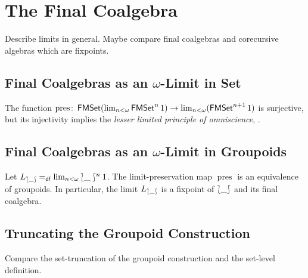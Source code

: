 \documentclass[runningheads]{llncs}
\begin{document}
\section{The Final Coalgebra}

Describe limits in general.
Maybe compare final coalgebras and corecursive algebras which are fixpoints.

\subsection{Final Coalgebras as an $\omega$-Limit in Set}


  \begin{theorem}\label{thm:InjPresImpliesLLPO}
    The function 
        $\operatorname{pres}\colon
            \operatorname{\mathsf{FMSet}} (\lim_{n < \omega} \operatorname{\mathsf{FMSet}}^n 1)
            \to
            \lim_{n < \omega} (\operatorname{\mathsf{FMSet}}^{n+1} 1)$
    is surjective,
    but its injectivity implies the \emph{lesser limited principle of omniscience}, \LLPO.
  \end{theorem}


\subsection{Final Coalgebras as an $\omega$-Limit in Groupoids}\label{ssec:FMGpdLim}

\begin{theorem}\label{thm:FMGpdLim}
  Let $L_{\lbag \mathord{\_} \rbag} \mathbin{=_\mathsf{df}} \lim_{n < \omega} \lbag \mathord{\_} \rbag^n 1$.
  The limit-preservation map $\operatorname{pres}$ is an equivalence of groupoids.
  In particular, the limit $L_{\lbag \mathord{\_} \rbag}$ is a fixpoint of $\lbag \mathord{\_} \rbag$ and its final coalgebra.
\end{theorem}

\subsection{Truncating the Groupoid Construction}

Compare the set-truncation of the groupoid construction
and the set-level definition.
\end{document}
